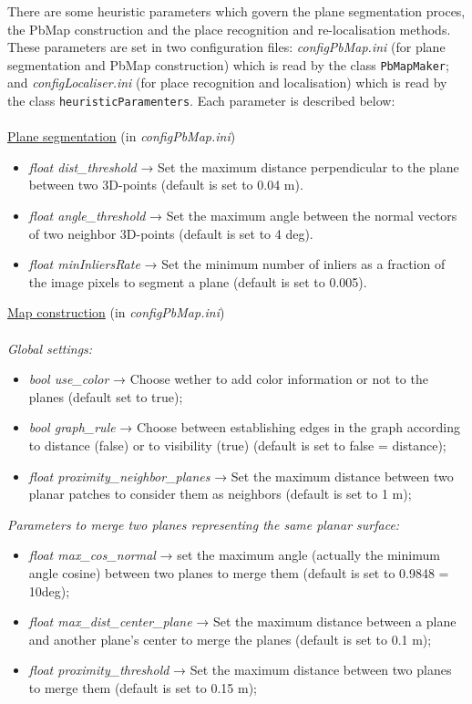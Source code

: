 \documentclass[a4paper,11pt]{article}
\begin{document}
There are some heuristic parameters which govern the plane segmentation proces, the PbMap construction and the place recognition  and re-localisation methods. These parameters are set in two configuration files: \emph{configPbMap.ini} (for plane segmentation and PbMap construction) which is read by the class \texttt{PbMapMaker}; and \emph{configLocaliser.ini} (for place recognition and localisation) which is read by the class \texttt{heuristicParamenters}. Each parameter is described below: \\
 \\
\underline{Plane segmentation} (in \emph{configPbMap.ini})
\begin{itemize}
\item \emph{float dist\_threshold} → Set the maximum distance perpendicular to the plane between two 3D-points (default is set to 0.04 m).
\item \emph{float angle\_threshold} → Set the maximum angle between the normal vectors of two neighbor 3D-points (default is set to 4 deg).
\item \emph{float minInliersRate} → Set the minimum number of inliers as a fraction of the image pixels to segment a plane (default is set to 0.005).

\end{itemize}
\underline{Map construction} (in  \emph{configPbMap.ini}) \\
\\
\emph{Global settings:}
\begin{itemize}
\item \emph{bool use\_color} → Choose wether to add color information or not to the planes (default set to true);
\item \emph{bool graph\_rule} → Choose between establishing edges in the graph according to distance (false) or to visibility (true) (default is set to false = distance);
\item \emph{float proximity\_neighbor\_planes} → Set the maximum distance between two planar patches to consider them as neighbors (default is set to 1 m);

\end{itemize}
\emph{Parameters to merge two planes representing the same planar surface:} 
\begin{itemize}
\item \emph{float max\_cos\_normal} → set the maximum angle (actually the minimum angle cosine) between two planes to merge them (default is set to 0.9848 = 10deg);
\item \emph{float max\_dist\_center\_plane} → Set the maximum distance between a plane and another plane's center to merge the planes (default is set to 0.1 m);
\item \emph{float proximity\_threshold} → Set the maximum distance between two planes to merge them (default is set to 0.15 m); 
\end{itemize}
\end{document}
